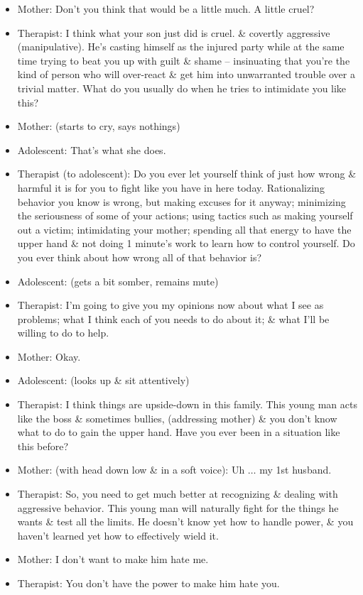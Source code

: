 \documentclass{article}
\numberwithin{equation}{section}
\begin{document}
\begin{itemize}
	\item Mother: Don't you think that would be a little much. A little cruel?
	\item Therapist: I think what your son just did is cruel. \& covertly aggressive (manipulative). He's casting himself as the injured party while at the same time trying to beat you up with guilt \& shame -- insinuating that you're the kind of person who will over-react \& get him into unwarranted trouble over a trivial matter. What do you usually do when he tries to intimidate you like this?
	\item Mother: (starts to cry, says nothings)
	\item Adolescent: That's what she does.
	\item Therapist (to adolescent): Do you ever let yourself think of just how wrong \& harmful it is for you to fight like you have in here today. Rationalizing behavior you know is wrong, but making excuses for it anyway; minimizing the seriousness of some of your actions; using tactics such as making yourself out a victim; intimidating your mother; spending all that energy to have the upper hand \& not doing 1 minute's work to learn how to control yourself. Do you ever think about how wrong all of that behavior is?
	\item Adolescent: (gets a bit somber, remains mute)
	\item Therapist: I'm going to give you my opinions now about what I see as problems; what I think each of you needs to do about 
	it; \& what I'll be willing to do to help.
	\item Mother: Okay.
	\item Adolescent: (looks up \& sit attentively)
	\item Therapist: I think things are upside-down in this family. This young man acts like the boss \& sometimes bullies, (addressing mother) \& you don't know what to do to gain the upper hand. Have you ever been in a situation like this before?
	\item Mother: (with head down low \& in a soft voice): Uh $\ldots$ my 1st husband.
	\item Therapist: So, you need to get much better at recognizing \& dealing with aggressive behavior. This young man will naturally fight for the things he wants \& test all the limits. He doesn't know yet how to handle power, \& you haven't learned yet how to effectively wield it.
	\item Mother: I don't want to make him hate me.
	\item Therapist: You don't have the power to make him hate you.

\end{itemize}
\end{document}
